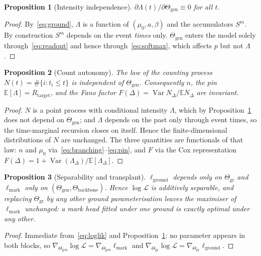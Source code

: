 \documentclass[11pt]{article}
\newtheorem{proposition}{Proposition}
\theoremstyle{remark}
\newcommand{\E}{\mathbb{E}}
\newcommand{\Rtar}{R_{\mathrm{target}}}
\begin{document}
\begin{proposition}[Intensity independence]
\label{prop:indep}
$\partial\Lambda(t)/\partial\Theta_{\mathrm{gen}}\equiv0$ for all $t$.
\end{proposition}
\begin{proof}
By~\eqref{eq:ground}, $\Lambda$ is a function of $(\mu_0,a,\beta)$ and the
accumulators $S^m$. By construction $S^m$ depends on the event \emph{times}
only. $\Theta_{\mathrm{gen}}$ enters the model solely through~\eqref{eq:readout}
and hence through~\eqref{eq:softmax}, which affects $p$ but not $\Lambda$.
\end{proof}

\begin{proposition}[Count autonomy]
\label{prop:autonomy}
The law of the counting process $N(t)=\#\{i:t_i\le t\}$ is independent of
$\Theta_{\mathrm{gen}}$. Consequently $n$, the pin $\E[\Lambda]=\Rtar$, and the
Fano factor $F(\Delta)=\operatorname{Var}N_\Delta/\E N_\Delta$ are invariant.
\end{proposition}
\begin{proof}
$N$ is a point process with conditional intensity $\Lambda$, which by
Proposition~\ref{prop:indep} does not depend on $\Theta_{\mathrm{gen}}$; and
$\Lambda$ depends on the past only through event times, so the time-marginal
recursion closes on itself. Hence the finite-dimensional distributions of $N$
are unchanged. The three quantities are functionals of that law:
$n$ and $\mu_0$ via~\eqref{eq:branching}--\eqref{eq:pin}, and $F$ via the Cox
representation $F(\Delta)=1+\operatorname{Var}(\Lambda_\Delta)/\E[\Lambda_\Delta]$.
\end{proof}

\begin{proposition}[Separability and transplant]
\label{prop:transplant}
$\ell_{\mathrm{ground}}$ depends only on $\Theta_{\mathrm{gr}}$ and
$\ell_{\mathrm{mark}}$ only on $(\Theta_{\mathrm{gen}},\Theta_{\mathrm{backbone}})$.
Hence $\log\mathcal L$ is additively separable, and replacing
$\Theta_{\mathrm{gr}}$ by any other ground parameterisation leaves the
maximiser of $\ell_{\mathrm{mark}}$ unchanged: a mark head fitted under one
ground is exactly optimal under any other.
\end{proposition}
\begin{proof}
Immediate from~\eqref{eq:loglik} and Proposition~\ref{prop:indep}: no parameter
appears in both blocks, so $\nabla_{\Theta_{\mathrm{gen}}}\log\mathcal L
=\nabla_{\Theta_{\mathrm{gen}}}\ell_{\mathrm{mark}}$ and
$\nabla_{\Theta_{\mathrm{gr}}}\log\mathcal L
=\nabla_{\Theta_{\mathrm{gr}}}\ell_{\mathrm{ground}}$.
\end{proof}
\end{document}
